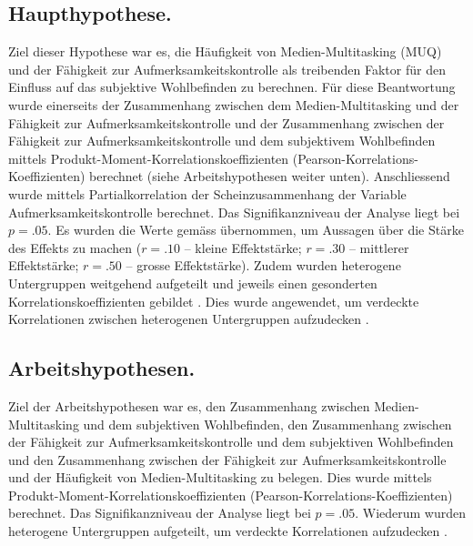 \subsection{Haupthypothese.} Ziel dieser Hypothese war es, die Häufigkeit von Medien-Multitasking (MUQ) und der Fähigkeit zur Aufmerksamkeitskontrolle als treibenden Faktor für den Einfluss auf das subjektive Wohlbefinden zu berechnen. Für diese Beantwortung wurde einerseits der Zusammenhang zwischen dem Medien-Multitasking und der Fähigkeit zur Aufmerksamkeitskontrolle und der Zusammenhang zwischen der Fähigkeit zur Aufmerksamkeitskontrolle und dem subjektivem Wohlbefinden mittels Produkt-Moment-Korrelationskoeffizienten (Pearson-Korrelations-Koeffizienten) berechnet (siehe Arbeitshypothesen weiter unten). Anschliessend wurde mittels Partialkorrelation der Scheinzusammenhang der Variable Aufmerksamkeitskontrolle berechnet. Das Signifikanzniveau der Analyse liegt bei $p=.05$. Es wurden die Werte gemäss \cite{Cohen1988} übernommen, um Aussagen über die Stärke des Effekts zu machen ($r=.10$ -- kleine Effektstärke; $r=.30$ -- mittlerer Effektstärke; $r=.50$ -- grosse Effektstärke). Zudem wurden heterogene Untergruppen weitgehend aufgeteilt und jeweils einen gesonderten Korrelationskoeffizienten gebildet \cite{Renkewitz2008}. Dies wurde angewendet, um verdeckte Korrelationen zwischen heterogenen Untergruppen aufzudecken \cite{Ebermann2014}.

\subsection{Arbeitshypothesen.} Ziel der Arbeitshypothesen war es, den Zusammenhang zwischen Medien-Multitasking und dem subjektiven Wohlbefinden, den Zusammenhang zwischen der Fähigkeit zur Aufmerksamkeitskontrolle und dem subjektiven Wohlbefinden und den Zusammenhang zwischen der Fähigkeit zur Aufmerksamkeitskontrolle und der Häufigkeit von Medien-Multitasking zu belegen. Dies wurde mittels Produkt-Moment-Korrelationskoeffizienten (Pearson-Korrelations-Koeffizienten) berechnet. Das Signifikanzniveau der Analyse liegt bei $p=.05$. Wiederum wurden heterogene Untergruppen aufgeteilt, um verdeckte Korrelationen aufzudecken \cite{Ebermann2014}.


